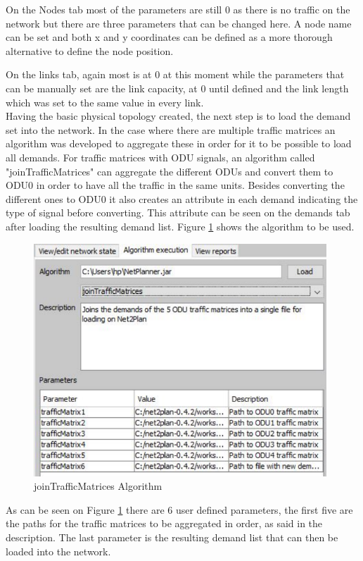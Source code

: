 	On the Nodes tab most of the parameters are still 0 as there is no traffic on the network but there are three parameters that can be changed here. A node name can be set and both x and y coordinates can be defined as a more thorough alternative to define the node position.
	
	On the links tab, again most is at 0 at this moment while the parameters that can be manually set are the link capacity, at 0 until defined and the link length which was set to the same value in every link.\\
	
	Having the basic physical topology created, the next step is to load the demand set into the network. In the case where there are multiple traffic matrices an algorithm was developed to aggregate these in order for it to be possible to load all demands.
	For traffic matrices with ODU signals, an algorithm called "joinTrafficMatrices" can aggregate the different ODUs and convert them to ODU0 in order to have all the traffic in the same units. Besides converting the different ones to ODU0 it also creates an attribute in each demand indicating the type of signal before converting. This attribute can be seen on the demands tab after loading the resulting demand list. Figure \ref{joinMatrices} shows the algorithm to be used.
	

	\begin{figure}[h!]
		\centering
		\includegraphics[width=11cm]{Net2Plan_joinMatrices.pdf}
		\caption{joinTrafficMatrices Algorithm}
		\label{joinMatrices}		
	\end{figure}
	
	As can be seen on Figure \ref{joinMatrices} there are 6 user defined parameters, the first five are the paths for the traffic matrices to be aggregated in order, as said in the description. The last parameter is the resulting demand list that can then be loaded into the network.
	
